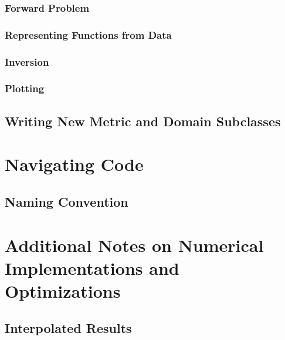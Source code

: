 \documentclass[10pt]{article}
\begin{document}
		\subsubsection{Forward Problem}
		\subsubsection{Representing Functions from Data}
		\subsubsection{Inversion}
		\subsubsection{Plotting}
		

		
	\subsection{Writing New Metric and Domain Subclasses}



\newpage
\section{Navigating Code}

	\subsection{Naming Convention}


\newpage
\section{Additional Notes on Numerical Implementations and Optimizations}

	\subsection{Interpolated Results}
		
\end{document}
